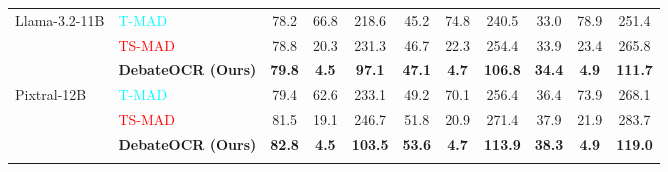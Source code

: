 \documentclass{article}
\theoremstyle{plain}
\theoremstyle{definition}
\theoremstyle{remark}
\begin{document}
\begin{table}[t!]
{\begin{tabular}{@{}ll@{\hskip 10pt}ccc@{\hskip 10pt}ccc@{\hskip 10pt}ccc@{}}
\cmidrule(lr){2-11}
\rowcolor{white}
Llama-3.2-11B   & \textcolor{cyan}{T-MAD}       & 78.2  & 66.8  & 218.6 & 45.2 & 74.8 & 240.5 & 33.0 & 78.9 & 251.4 \\
\rowcolor{white}
                & \textcolor{red}{TS-MAD}       & 78.8  & 20.3  & 231.3 & 46.7 & 22.3 & 254.4 & 33.9 & 23.4 & 265.8 \\
\rowcolor{lightgray}
                & \textbf{DebateOCR (Ours)}   & \textbf{79.8} & \textbf{4.5} & \textbf{97.1} & 
                                         \textbf{47.1} & \textbf{4.7} & \textbf{106.8} & 
                                         \textbf{34.4} & \textbf{4.9} & \textbf{111.7} \\
\cmidrule(lr){2-11}
\rowcolor{white}
Pixtral-12B     & \textcolor{cyan}{T-MAD}      & 79.4  & 62.6  & 233.1 & 49.2 & 70.1 & 256.4 & 36.4 & 73.9 & 268.1 \\
\rowcolor{white}
                & \textcolor{red}{TS-MAD}          & 81.5  & 19.1  & 246.7 & 51.8 & 20.9 & 271.4 & 37.9 & 21.9 & 283.7 \\
\rowcolor{lightgray}
                & \textbf{DebateOCR (Ours)}   & \textbf{82.8} & \textbf{4.5} & \textbf{103.5} & 
                                         \textbf{53.6} & \textbf{4.7} & \textbf{113.9} & 
                                         \textbf{38.3} & \textbf{4.9} & \textbf{119.0} \\
\bottomrule
\vspace{-7mm}
\end{tabular}
}
\end{table}
\end{document}
